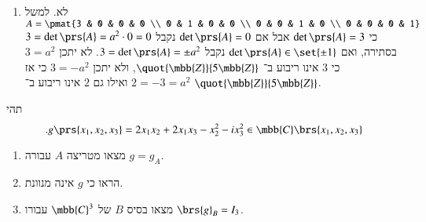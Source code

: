 \documentclass[a4paper,10pt,oneside,openany]{article}
\begin{document}
\begin{solution}
\begin{enumerate}
\item
לא.
למשל
$A = \pmat{3 & 0 & 0 & 0 \\ 0 & 1 & 0 & 0 \\ 0 & 0 & 1 & 0 \\ 0 & 0 & 0 & 1}$
כי
$\det\prs{A} = 3$
אבל אם
$\det\prs{A} = 0$
נקבל
$3 = \det\prs{A} = a^2 \cdot 0 = 0$
בסתירה, ואם
$\det\prs{A} \in \set{\pm 1}$
נקבל
$3 = \det\prs{A} = \pm a^2$.
לא יתכן
$3 = a^2$
כי
$3$
אינו ריבוע ב־%
$\quot{\mbb{Z}}{5\mbb{Z}}$,
ולא יתכן
$3 = -a^2$
כי אז
$2 = -3 = a^2$
ואילו גם
$2$
אינו ריבוע ב־%
$\quot{\mbb{Z}}{5\mbb{Z}}$.
\end{enumerate}
\end{solution}

\begin{exercise}
תהי
\[\text{.} g\prs{x_1, x_2, x_3} = 2 x_1 x_2 + 2 x_1 x_3 - x_2^2 - i x_3^2 \in \mbb{C}\brs{x_1, x_2, x_3}\]

\begin{enumerate}
\item מצאו מטריצה
$A$
עבורה
$g = g_A$.

\item הראו כי
$g$
אינה מנוונת.

\item מצאו בסיס
$B$
של
$\mbb{C}^3$
עבורו
$\brs{g}_B = I_3$.
\end{enumerate}
\end{exercise}
\end{document}
